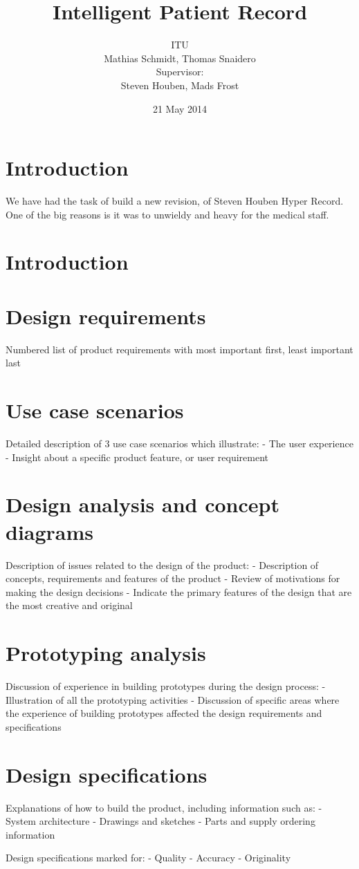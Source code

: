\documentclass{article}
\title{Intelligent Patient Record}
\author{ITU \\
Mathias Schmidt, Thomas Snaidero \\
Supervisor: \\
Steven Houben, Mads Frost}
\date{21 May 2014}
\begin{document}
\maketitle

\pagebreak

\tableofcontents

\pagebreak


\section{Introduction}
We have had the task of build a new revision, of Steven Houben Hyper Record.
One of the big reasons is it was to unwieldy and heavy for the medical staff.


\section{Introduction}

\section{Design requirements}
Numbered list of product requirements with most important first, least important last

\section{Use case scenarios}
Detailed description of 3 use case scenarios which illustrate:
- The user experience
- Insight about a specific product feature, or user requirement

\section{Design analysis and concept diagrams}
Description of issues related to the design of the product:
- Description of concepts, requirements and features of the product
- Review of motivations for making the design decisions
- Indicate the primary features of the design that are the most creative and original

\section{Prototyping analysis}
Discussion of experience in building prototypes during the design process:
- Illustration of all the prototyping activities
- Discussion of specific areas where the experience of building prototypes affected the design requirements and specifications

\section{Design specifications}
Explanations of how to build the product, including information such as:
- System architecture
- Drawings and sketches
- Parts and supply ordering information

Design specifications marked for:
- Quality
- Accuracy
- Originality



% 

% 

% 
\end{document}
